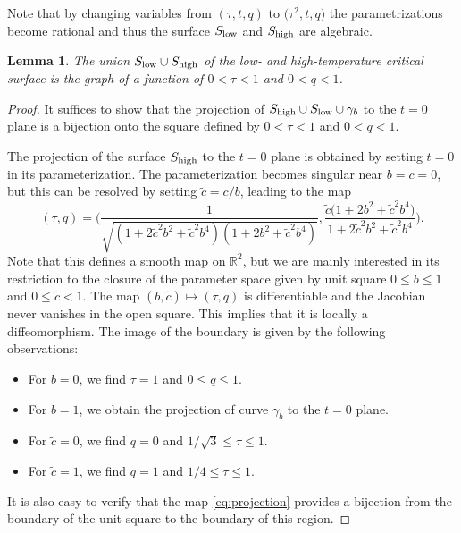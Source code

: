 \documentclass[10pt,a4paper]{amsart}
\numberwithin{equation}{section}
\newtheorem{Lemma}[Theorem]{Lemma}
\begin{document}
Note that by changing variables from $(\tau,t,q)$ to $\bigl(\tau^2,t,q\bigr)$ the parametrizations become rational and thus the surface $S_{{\rm low}}$ and $S_{{\rm high}}$ are algebraic.
\begin{Lemma} \label{lem:surface=graph}
 The union $S_{{\rm low}}\cup S_{{\rm high}}$ of the low- and high-temperature critical surface is the graph of a function of $0<\tau<1$ and $0<q<1$.
\end{Lemma}
\begin{proof}
It suffices to show that the projection of $S_{{\rm high}} \cup S_{{\rm low}}\cup \gamma_b$ to the $t=0$ plane is a bijection onto the square defined by $0 < \tau <1$ and $0 < q < 1$.

 The projection of the surface $S_{{\rm high}}$ to the $t=0$ plane is obtained by setting $t=0$ in its parameterization. The parameterization becomes singular near $b=c=0$, but this can be resolved by setting $\tilde c=c/b$, leading to the map
 \begin{equation} \label{eq:projection}
(\tau,q)= \Biggl(\frac{1}{\sqrt{(1+ 2\tilde c^2 b^2 + \tilde c^2b^4)(1+2b^2 +\tilde c^2b^4)}},
 \frac{\tilde c \bigl(1+2b^2 +\tilde c^2b^4\bigr)}{1+ 2\tilde c^2 b^2 + \tilde c^2b^4}
\Biggr).
\end{equation}
 Note that this defines a smooth map on $\mathbb R^2$, but we are mainly interested in its restriction to the closure of the parameter space given by unit square $0\leq b\leq 1$ and $0\leq \tilde c<1$. The map $(b,\tilde c) \mapsto (\tau,q)$ is differentiable and the Jacobian never vanishes in the open square. This implies that it is locally a diffeomorphism. The image of the boundary is given by the following observations:
\begin{itemize}\itemsep=0pt
\item For $b=0$, we find $\tau=1$ and $0\leq q \leq 1$.

\item For $b=1$, we obtain the projection of curve $\gamma_b$ to the $t=0$ plane.

\item For $\tilde c=0$, we find $q=0$ and $1/\sqrt{3} \leq \tau \leq 1$.

\item For $\tilde c=1$, we find $q=1$ and $1/4 \leq \tau \leq 1$.
\end{itemize}

 It is also easy to verify that the map \eqref{eq:projection} provides a bijection from the boundary of the unit square to the boundary of this region.


\end{proof}
\end{document}

